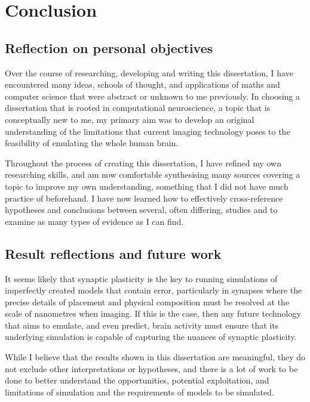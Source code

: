 \chapter{Conclusion}

\section{Reflection on personal objectives}

Over the course of researching, developing and writing this dissertation, I have
encountered many ideas, schools of thought, and applications of maths and
computer science that were abstract or unknown to me previously. In choosing a
dissertation that is rooted in computational neuroscience, a topic that is
conceptually new to me, my primary aim was to develop an original understanding
of the limitations that current imaging technology poses to the feasibility of
emulating the whole human brain. 

Throughout the process of creating this dissertation, I have refined my own
researching skills, and am now comfortable synthesising many sources covering a
topic to improve my own understanding, something that I did not have much
practice of beforehand. I have now learned how to effectively cross-reference
hypotheses and conclusions between several, often differing, studies and to
examine as many types of evidence as I can find.



\section{Result reflections and future work}

It seems likely that synaptic plasticity is the key to running simulations of
imperfectly created models that contain error, particularly in synapses where
the precise details of placement and physical composition must be resolved at
the scale of nanometres when imaging. If this is the case, then any future
technology that aims to emulate, and even predict, brain activity must ensure
that its underlying simulation is capable of capturing the nuances of synaptic
plasticity. 

While I believe that the results shown in this dissertation are meaningful, they
do not exclude other interpretations or hypotheses, and there is a lot of work
to be done to better understand the opportunities, potential exploitation, and
limitations of simulation and the requirements of models to be simulated.

